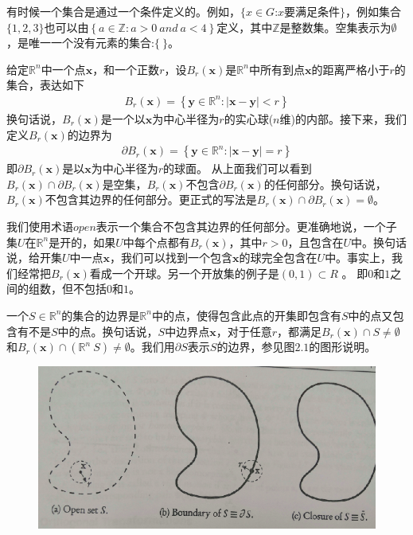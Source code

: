 有时候一个集合是通过一个条件定义的。例如，$ \lbrace x\in G$:$x$要满足条件$\rbrace$，例如集合$\lbrace 1,2,3\rbrace$也可以由$\left\{ a \in \mathbb{Z}:a>0~and~a<4  \right\}$定义，其中$\mathbb{Z}$是整数集。空集表示为$\emptyset $，是唯一一个没有元素的集合:$\lbrace  ~ \rbrace$。

给定$\mathbb{R}^n$中一个点$\mathbf{x}$，和一个正数$r$，设$B_r(\mathbf{x})$是$\mathbb{R}^n$中所有到点$\mathbf{x}$的距离严格小于$r$的集合，表达如下
\begin{gather}
B_r(\mathbf{x})=\left\{ \mathbf{y} \in \mathbb{R}^n:\left| \mathbf{x} - \mathbf{y} \right| <r \right\}
\end{gather}
换句话说，$B_r(\mathbf{x})$是一个以$\mathbf{x}$为中心半径为$r$的实心球($n$维)的内部。接下来，我们定义$B_r(\mathbf{x})$的边界为
\begin{gather}
\partial B_r(\mathbf{x})=\left\{ \mathbf{y} \in \mathbb{R}^n:\left| \mathbf{x} - \mathbf{y} \right|=r  \right\}
\end{gather}
即$\partial B_r(\mathbf{x})$是以$\mathbf{x}$为中心半径为$r$的球面。
从上面我们可以看到$B_r(\mathbf{x}) \cap \partial B_r(\mathbf{x})$是空集，$B_r(\mathbf{x})$不包含$\partial B_r(\mathbf{x})$的任何部分。换句话说，$B_r(\mathbf{x})$不包含其边界的任何部分。更正式的写法是$B_r(\mathbf{x}) \cap \partial B_r(\mathbf{x})=\emptyset$。

我们使用术语$open$表示一个集合不包含其边界的任何部分。更准确地说，一个子集$U$在$\mathbb{R}^n$是开的，如果$U$中每个点都有$B_r(\mathbf{x})$，其中$r>0$，且包含在$U$中。换句话说，给开集$U$中一点$\mathbf{x}$，我们可以找到一个包含$\mathbf{x}$的球完全包含在$U$中。事实上，我们经常把$B_r(\mathbf{x})$看成一个开球。另一个开放集的例子是$(0,1)\subset R$ 。 即$0$和$1$之间的组数，但不包括$0$和$1$。

一个$S\in \mathbb{R}^n$的集合的边界是$\mathbb{R}^n$中的点，使得包含此点的开集即包含有$S$中的点又包含有不是$S$中的点。换句话说，$S$中边界点$\mathbf{x}$，对于任意$r$，都满足$B_r(\mathbf{x}) \cap S\neq \emptyset$和$B_r(\mathbf{x}) \cap (\mathbb{R}^n \ S)\neq \emptyset$。我们用$\partial S$表示$S$的边界，参见图$2.1$的图形说明。
\begin{figure}[H]
\centering
\includegraphics[scale=0.5]{./figures/21.png}
\caption{}
\end{figure}

